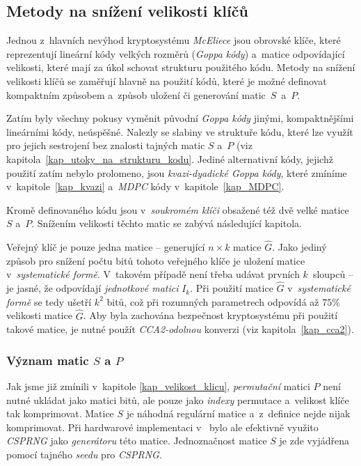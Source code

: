 \documentclass[thesis=M,czech,hidelinks]{FITthesis}[2012/06/26]
\newcommand{\0}{{\textcolor[gray]{0.75}{0}}}
\begin{document}
\subsection{Metody na snížení velikosti klíčů}\label{kap_snizeni_velikosti_klicu}

Jednou z~hlavních nevýhod kryptosystému \emph{McEliece} jsou obrovské klíče,
které reprezentují lineární kódy velkých rozměrů (\emph{Goppa kódy}) a~matice
odpovídající velikosti, které mají za úkol schovat strukturu použitého kódu.
Metody na snížení velikosti klíčů se zaměřují hlavně na použití kódů, které je
možné definovat kompaktním způsobem a~způsob uložení či generování
matic~$S$~a~$P$.

Zatím byly všechny pokusy vyměnit původní \emph{Goppa kódy} jinými,
kompaktnějšími lineárními kódy, neúspěšné. Nalezly se slabiny ve struktuře kódu,
které lze využít pro jejich sestrojení bez znalosti tajných matic $S$ a~$P$ (viz
kapitola~\ref{kap_utoky_na_strukturu_kodu}. Jediné alternativní kódy, jejichž
použití zatím nebylo prolomeno, jsou \emph{kvazi-dyadické Goppa kódy}, které
zmíníme v~kapitole~\ref{kap_kvazi} a~\emph{MDPC} kódy v~kapitole~\ref{kap_MDPC}.

Kromě definovaného kódu jsou v~\emph{soukromém klíči} obsažené též dvě velké
matice $S$ a~$P$. Snížením velikosti těchto matic se zabývá následující
kapitola.

Veřejný klíč je pouze jedna matice --  generující $n \times k$
matice $\hat{G}$. Jako jediný způsob pro snížení počtu bitů tohoto veřejného
klíče je uložení matice v~\emph{systematické formě}. V~takovém případě není
třeba udávat prvních $k$~sloupců -- je jasné, že odpovídají \emph{jednotkové
matici} $I_k$. Při použití matice $\hat{G}$ v~\emph{systematické formě} se tedy
ušetří $k^2$ bitů, což při rozumných parametrech odpovídá až $75 $\;\% velikosti
matice $\hat{G}$. Aby byla zachována bezpečnost kryptosystému při použití takové
matice, je nutné použít \emph{CCA2-odolnou} konverzi (viz
kapitola~\ref{kap_cca2}).


\subsubsection{Význam matic $S$ a $P$}

Jak jsme již zmínili v~kapitole \ref{kap_velikost_klicu}, \emph{permutační}
matici $P$ není nutné ukládat jako matici bitů, ale pouze jako \emph{indexy}
permutace a~velikost klíče tak komprimovat. Matice $S$ je náhodná regulární
matice a~z~definice nejde nijak komprimovat. Při hardwarové implementaci
v~\cite{Paustjan} bylo ale efektivně využito \emph{CSPRNG} jako
\emph{generátoru} této matice. Jednoznačnost matice $S$ je zde vyjádřena pomocí
tajného \emph{seedu} pro \emph{CSPRNG}.
\end{document}
